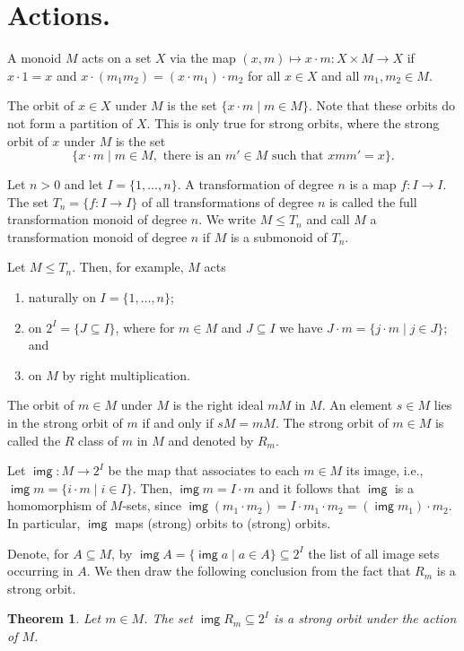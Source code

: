 \documentclass[12pt]{amsart}
\newtheorem{Thm}{Theorem}
\newcommand{\img}{\mathop{\mathsf{img}}}
\begin{document}
\section{Actions.}
A monoid $M$ acts on a set $X$ via the map $(x,  m) \mapsto x \cdot m\colon X
\times M \to  X$ if $x \cdot  1 = x$  and $x \cdot (m_1  m_2) = (x \cdot m_1)
\cdot m_2$ for all $x \in X$ and all $m_1, m_2 \in M$.

The orbit  of $x \in  X$ under $M$ is the  set $\{x \cdot m  \mid m \in M\}$. 
Note that these orbits do not form a partition of $X$.  This is only true for
strong orbits, where the strong orbit of $x$ under $M$ is the set
\[
  \{ x \cdot m \mid m \in M, 
  \mbox{\ there is an $m' \in M$ such that $x m m' = x$} \}.
\]

Let $n > 0$ and let $I = \{1, \dots, n\}$.  A transformation of degree $n$ is
a  map $f \colon I  \to  I$.  The set  $T_n =  \{f \colon  I  \to I\}$ of all
transformations  of degree $n$  is called  the full  transformation monoid of
degree  $n$.  We write $M  \leq T_n$ and  call $M$ a transformation monoid of
degree $n$ if $M$ is a submonoid of $T_n$.

Let $M \leq T_n$.  Then, for example, $M$ acts
\begin{enumerate}\renewcommand{\labelenumi}{(\roman{enumi})}
\item  naturally on $I = \{1, \dots, n\}$;
\item  on $2^I  =  \{ J \subseteq  I\}$,  where for   $m \in M$  and $J
  \subseteq I$ we have $J \cdot m = \{j \cdot m \mid j \in J\}$; and
\item on $M$ by right multiplication.
\end{enumerate}

The orbit of $m \in M$ under $M$ is the right  ideal $mM$ in $M$.  An element
$s  \in M$ lies in the  strong orbit of $m$ if  and only if $sM   = mM$.  The
strong orbit of $m \in M$ is called the  $R$ class of $m$  in $M$ and denoted
by $R_m$.  

Let $\img \colon M \to 2^I$ be the map that associates  to each $m \in M$ its
image, i.e., $\img m = \{i \cdot m \mid i \in I\}$.  Then, $\img  m = I \cdot
m$ and it follows that $\img$ is a homomorphism of $M$-sets, since $\img (m_1
\cdot m_2) = I \cdot m_1 \cdot  m_2 = (\img  m_1) \cdot m_2$.  In particular,
$\img$ maps (strong) orbits to (strong) orbits.

Denote, for $A \subseteq M$, by $\img  A = \{\img a \mid  a \in A\} \subseteq
2^I$ the list of all image sets occurring in $A$.  We then draw the following
conclusion from the fact that $R_m$ is a strong orbit.
\begin{Thm}
  Let $m \in M$.  The set $\img R_m \subseteq  2^I$ is a strong  orbit under
  the action of $M$.
\end{Thm}
\end{document}
